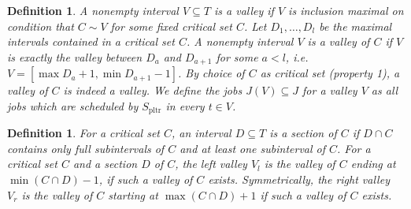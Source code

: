 \documentclass[a4paper]{article}
\DeclareMathOperator{\pltr}{pltr}
\DeclareMathOperator{\crit}{crit}
\newtheorem{definition}[theorem]{Definition}
\begin{document}
\begin{definition}
A nonempty interval $V \subseteq T$ is a \emph{valley} if $V$ is inclusion maximal on condition that $C \sim V$ for some fixed critical set $C$.
Let $D_1, \ldots, D_l$ be the maximal intervals contained in a critical set $C$.
A nonempty interval $V$ is a \emph{valley of $C$} if $V$ is exactly the valley between $D_{a}$ and $D_{a+1}$ for some $a < l$, i.e. $V = [\max D_a + 1, \min D_{a+1} - 1]$.
By choice of $C$ as critical set (property 1), a valley of $C$ is indeed a valley.
We define the jobs $J(V) \subseteq J$ for a valley $V$ as all jobs which are scheduled by $S_{\pltr}$ in every $t \in V$.
%  
\end{definition}
\begin{definition}
  For a critical set $C$, an interval $D \subseteq T$ \emph{is a section of} $C$ if $D \cap C$ contains only full subintervals of $C$ and at least one subinterval of $C$.
  For a critical set $C$ and a section $D$ of $C$, the \emph{left valley} $V_l$ is the valley of $C$ ending at $\min (C \cap D) - 1$, if such a valley of $C$ exists.
  Symmetrically, the \emph{right valley} $V_r$ is the valley of $C$ starting at $\max (C \cap D) + 1$ if such a valley of $C$ exists.
\end{definition}
\end{document}
